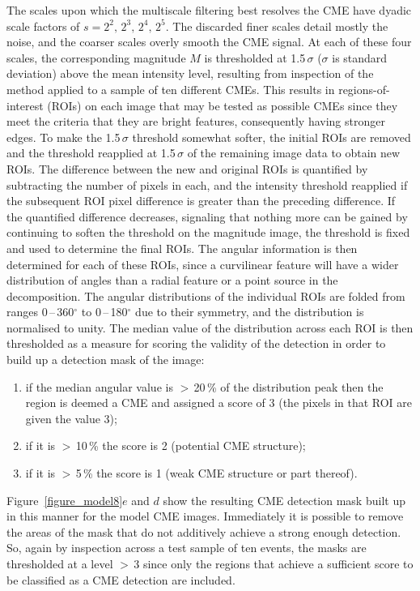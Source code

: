 \documentclass[namedreferences]{SolarPhysics}
\begin{document}
\begin{article}
The scales upon which the multiscale filtering best resolves the CME have dyadic scale factors of $s=2^{2},\,2^{3},\,2^{4},\,2^{5}$. The discarded finer scales detail mostly the noise, and the coarser scales overly smooth the CME signal. At each of these four scales, the corresponding magnitude $M$ is thresholded at 1.5\,$\sigma$ ($\sigma$ is standard deviation) above the mean intensity level, resulting from inspection of the method applied to a sample of ten different CMEs. This results in regions-of-interest (ROIs) on each image that may be tested as possible CMEs since they meet the criteria that they are bright features, consequently having stronger edges. To make the 1.5\,$\sigma$ threshold somewhat softer, the initial ROIs are removed and the threshold reapplied at 1.5\,$\sigma$ of the remaining image data to obtain new ROIs. The difference between the new and original ROIs is quantified by subtracting the number of pixels in each, and the intensity threshold reapplied if the subsequent ROI pixel difference is greater than the preceding difference. If the quantified difference decreases, signaling that nothing more can be gained by continuing to soften the threshold on the magnitude image, the threshold is fixed and used to determine the final ROIs. The angular information is then determined for each of these ROIs, since a curvilinear feature will have a wider distribution of angles than a radial feature or a point source in the decomposition. The angular distributions of the individual ROIs are folded from ranges 0\,--\,360$^{\circ}$ to 0\,--\,180$^{\circ}$ due to their symmetry, and the distribution is normalised to unity. The median value of the distribution across each ROI is then thresholded as a measure for scoring the validity of the detection in order to build up a detection mask of the image:
\begin{enumerate}
\item if the median angular value is $>$\,20\,\% of the distribution peak then the region is deemed a CME and assigned a score of 3 (the pixels in that ROI are given the value 3);
\item if it is $>$\,10\,\% the score is 2 (potential CME structure);
\item if it is $>$\,5\,\% the score is 1 (weak CME structure or part thereof).
\end{enumerate}
Figure~\ref{figure_model8}$e$ and $d$ show the resulting CME detection mask built up in this manner for the model CME images. Immediately it is possible to remove the areas of the mask that do not additively achieve a strong enough detection. So, again by inspection across a test sample of ten events, the masks are thresholded at a level $>$\,3 since only the regions that achieve a sufficient score to be classified as a CME detection are included.


\end{article}
\end{document}
